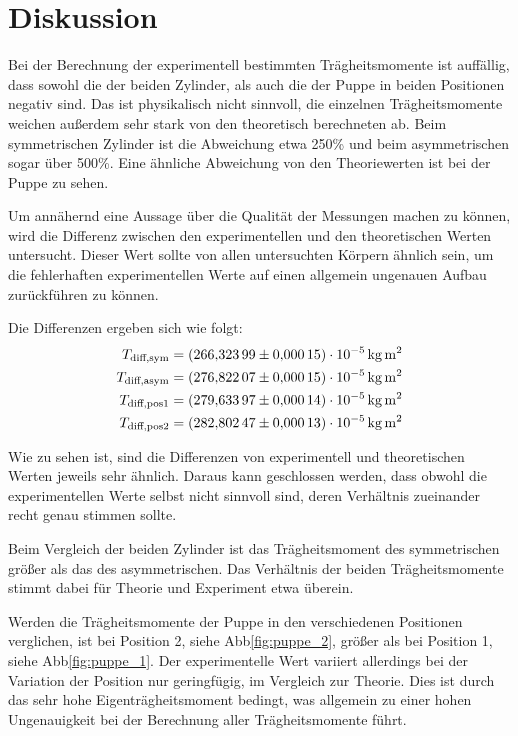 \section{Diskussion}
\label{sec:Diskussion}



Bei der Berechnung der experimentell bestimmten Trägheitsmomente ist auffällig, dass sowohl die der beiden Zylinder, als auch die 
der Puppe in beiden Positionen negativ sind. Das ist physikalisch nicht sinnvoll, die einzelnen 
Trägheitsmomente weichen außerdem sehr stark von den theoretisch berechneten ab. Beim symmetrischen Zylinder ist die Abweichung etwa
250\% und beim asymmetrischen sogar über 500\%. Eine ähnliche Abweichung von den Theoriewerten ist bei der Puppe zu sehen.

Um annähernd eine Aussage über die Qualität der Messungen machen zu können, wird die Differenz zwischen den experimentellen 
und den theoretischen Werten untersucht.
Dieser Wert sollte von allen untersuchten Körpern ähnlich sein, um 
die fehlerhaften experimentellen Werte auf einen allgemein ungenauen Aufbau zurückführen zu können.

Die Differenzen ergeben sich wie folgt:
\begin{align}
T_\text{diff,sym}& = \SI{266.32399 (00015)e-5}{\kilo\gram\square\m} \\
T_\text{diff,asym}& = \SI{276.82207 (00015)e-5}{\kilo\gram\square\m} \\
T_\text{diff,pos1}& = \SI{279.63397 (00014)e-5}{\kilo\gram\square\m} \\
T_\text{diff,pos2}& = \SI{282.80247 (00013)e-5}{\kilo\gram\square\m}
\end{align}

Wie zu sehen ist, sind die Differenzen von experimentell und theoretischen Werten jeweils sehr ähnlich.
Daraus kann geschlossen werden, dass obwohl die experimentellen Werte selbst nicht sinnvoll sind, deren Verhältnis zueinander recht 
genau stimmen sollte. 

Beim Vergleich der beiden Zylinder ist das Trägheitsmoment des symmetrischen größer als das des asymmetrischen. Das Verhältnis der
beiden Trägheitsmomente stimmt dabei für Theorie und Experiment etwa überein. 

Werden die Trägheitsmomente der Puppe in den verschiedenen Positionen verglichen, ist bei Position 2, siehe Abb\ref{fig:puppe_2}, 
größer als bei Position 1, siehe Abb\ref{fig:puppe_1}. Der experimentelle Wert variiert allerdings bei der Variation der Position nur
geringfügig, im Vergleich zur Theorie. Dies ist durch das sehr hohe Eigenträgheitsmoment bedingt, was allgemein zu einer hohen
Ungenauigkeit bei der Berechnung aller Trägheitsmomente führt. 

